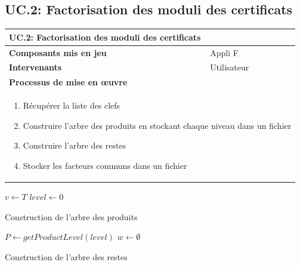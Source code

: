 \documentclass[a4paper,11pt,french]{article}
\begin{document}
\subsection{UC.2: Factorisation des moduli des certificats}
\begin{center}
	\vspace*{0.7cm}
	\begin{tabularx}{16cm}{|l|X|}
	\hline
	\multicolumn{2}{|l|}{\textbf{UC.2: Factorisation des moduli des certificats}}\\
	\hline
	\textbf{Composants mis en jeu} & Appli F\\
	\hline
	\textbf{Intervenants} & Utilisateur\\
	\hline
	\multicolumn{2}{|l|}{\textbf{Processus de mise en \oe uvre}}\\
	\hline
	\multicolumn{2}{|p{15cm}|}{
	\begin{enumerate}
	\item Récupérer la liste des clefs
	\item Construire l'arbre des produits en stockant chaque niveau dans un fichier
	\item Construire l'arbre des restes
	\item Stocker les facteurs communs dans un fichier
	\end{enumerate}
	}\\
	\hline
	\end{tabularx}
\end{center}
\begin{algorithm}[H]

 $v \leftarrow T$\;
 $level \leftarrow 0$\;
 \caption{Construction de l'arbre des produits}
\end{algorithm}
\vspace{1cm}
\begin{algorithm}[H]

 $P \leftarrow getProductLevel(level)$\;
 $w \leftarrow \emptyset$\;
 \caption{Construction de l'arbre des restes}
\end{algorithm}
\end{document}

